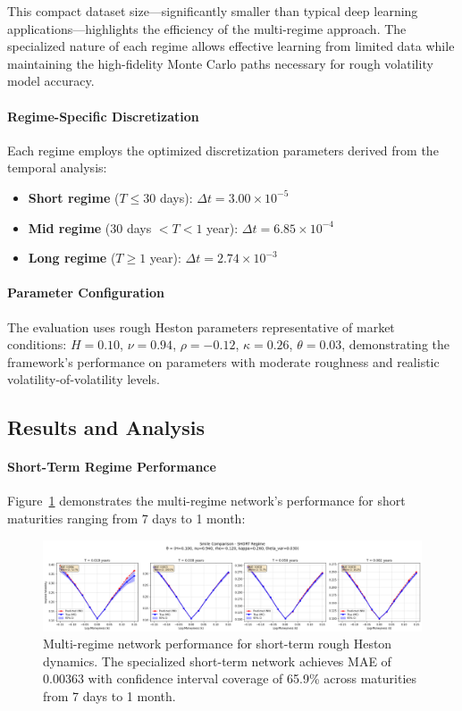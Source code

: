 	This compact dataset size—significantly smaller than typical deep learning applications—highlights the efficiency of the multi-regime approach. The specialized nature of each regime allows effective learning from limited data while maintaining the high-fidelity Monte Carlo paths necessary for rough volatility model accuracy.
	
	\paragraph{Regime-Specific Discretization}
	Each regime employs the optimized discretization parameters derived from the temporal analysis:
	\begin{itemize}[nosep]
		\item \textbf{Short regime} ($T \leq 30$ days): $\Delta t = 3.00 \times 10^{-5}$
		\item \textbf{Mid regime} (30 days $< T < 1$ year): $\Delta t = 6.85 \times 10^{-4}$
		\item \textbf{Long regime} ($T \geq 1$ year): $\Delta t = 2.74 \times 10^{-3}$
	\end{itemize}
	
	\paragraph{Parameter Configuration}
	The evaluation uses rough Heston parameters representative of market conditions:
	$H = 0.10$, $\nu = 0.94$, $\rho = -0.12$, $\kappa = 0.26$, $\theta = 0.03$, demonstrating the framework's performance on parameters with moderate roughness and realistic volatility-of-volatility levels.
	
	\subsection{Results and Analysis}
	
	\paragraph{Short-Term Regime Performance}
	
	Figure~\ref{fig:multiregime-short} demonstrates the multi-regime network's performance for short maturities ranging from 7 days to 1 month:
	
	\begin{figure}[ht]
		\centering
		\includegraphics[width=\textwidth]{../images/smile_comparison_short_regime.png}
		\caption{Multi-regime network performance for short-term rough Heston dynamics. The specialized short-term network achieves MAE of 0.00363 with confidence interval coverage of 65.9\% across maturities from 7 days to 1 month.}
		\label{fig:multiregime-short}
	\end{figure}
	
